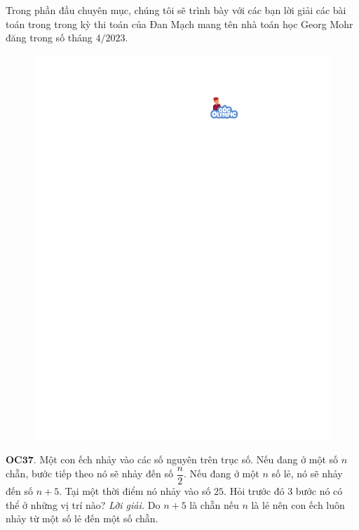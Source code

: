 \begin{multicols}{2}
	Trong phần đầu chuyên mục, chúng tôi sẽ trình bày với các bạn lời giải các bài toán trong trong kỳ thi toán của Đan Mạch mang tên nhà toán học Georg Mohr đăng trong số tháng $4/2023$. 
	\begin{figure}[H]
		\vspace*{-5pt}
		\centering
		\captionsetup{labelformat= empty, justification=centering}
		\includegraphics[width= 1\linewidth]{gocolympic}
		\vspace*{-10pt}
	\end{figure}
	{\bf\color{cackithi} OC$\pmb{37.}$} Một con ếch nhảy vào các số nguyên trên trục số. Nếu đang ở một số $n$ chẵn, bước tiếp theo nó sẽ nhảy đến số $\dfrac{n}{2}.$ Nếu đang ở một $n$ số lẻ, nó sẽ nhảy đến số $n + 5$. Tại một thời điểm nó nhảy vào số $25$. Hỏi trước đó $3$ bước nó có thể ở những vị trí nào?
	\vskip 0.1cm
	\textit{Lời giải.} Do $n + 5$ là chẵn nếu $n$ là lẻ nên con ếch luôn nhảy từ một số lẻ đến một số chẵn.

\end{multicols}
